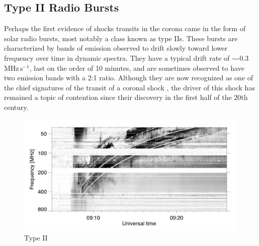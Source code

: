 \subsection{Type II Radio Bursts}
Perhaps the first evidence of shocks transits in the corona came in the form of solar radio bursts, most notably a class known as type IIs. These bursts are characterized by bands of emission observed to drift slowly toward lower frequency over time in dynamic spectra. They have a typical drift rate of $\sim$-0.3\,MHz\,s$^{-1}$, last on the order of 10 minutes, and are sometimes observed to have two emission bands with a 2:1 ratio. Although they are now recognized as one of the chief signatures of the transit of a coronal shock \citep{nelson1985, mann1996}, the driver of this shock has remained a topic of contention since their discovery in the first half of the 20th century.

\begin{figure}
\begin{center}
\includegraphics[trim=2cm 0cm 0cm 0cm, scale=0.25]{images/typeII}
\caption{Type II}
\end{center}
\label{fig:typeII}
\end{figure}

